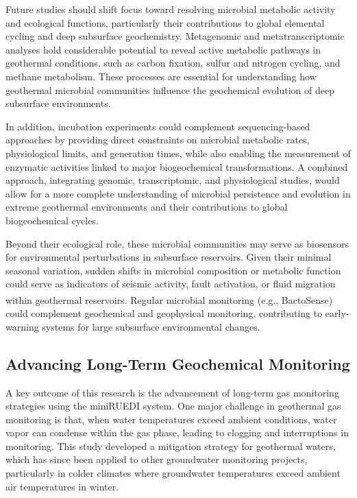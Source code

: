 Future studies should shift focus toward resolving microbial metabolic activity and ecological functions, particularly their contributions to global elemental cycling and deep subsurface geochemistry.
Metagenomic and metatranscriptomic analyses hold considerable potential to reveal active metabolic pathways in geothermal conditions, such as carbon fixation, sulfur and nitrogen cycling, and methane metabolism.
These processes are essential for understanding how geothermal microbial communities influence the geochemical evolution of deep subsurface environments.

In addition, incubation experiments could complement sequencing-based approaches by providing direct constraints on microbial metabolic rates, physiological limits, and generation times, while also enabling the measurement of enzymatic activities linked to major biogeochemical transformations.
A combined approach, integrating genomic, transcriptomic, and physiological studies, would allow for a more complete understanding of microbial persistence and evolution in extreme geothermal environments and their contributions to global biogeochemical cycles.

Beyond their ecological role, these microbial communities may serve as biosensors for environmental perturbations in subsurface reservoirs.
Given their minimal seasonal variation, sudden shifts in microbial composition or metabolic function could serve as indicators of seismic activity, fault activation, or fluid migration within geothermal reservoirs.
Regular microbial monitoring (e.g., BactoSense\textsuperscript{\tiny\textregistered}) could complement geochemical and geophysical monitoring, contributing to early-warning systems for large subsurface environmental changes.

\subsection*{Advancing Long-Term Geochemical Monitoring}
A key outcome of this research is the advancement of long-term gas monitoring strategies using the miniRUEDI system.
One major challenge in geothermal gas monitoring is that, when water temperatures exceed ambient conditions, water vapor can condense within the gas phase, leading to clogging and interruptions in monitoring.
This study developed a mitigation strategy for geothermal waters, which has since been applied to other groundwater monitoring projects, particularly in colder climates where groundwater temperatures exceed ambient air temperatures in winter.

